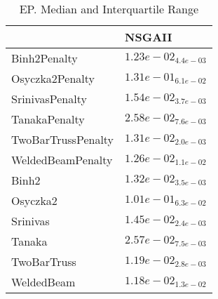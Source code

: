\documentclass{article}
\begin{document}
\begin{table}
\caption{EP. Median and Interquartile Range}
\label{table: EP}
\centering
\begin{scriptsize}
\begin{tabular}{ll}
\hline &  NSGAII\\
\hline 
Binh2Penalty & \cellcolor{gray95}$  1.23e-02_{ 4.4e-03}$ \\
Osyczka2Penalty & \cellcolor{gray95}$  1.31e-01_{ 6.1e-02}$ \\
SrinivasPenalty & \cellcolor{gray95}$  1.54e-02_{ 3.7e-03}$ \\
TanakaPenalty & \cellcolor{gray95}$  2.58e-02_{ 7.6e-03}$ \\
TwoBarTrussPenalty & \cellcolor{gray95}$  1.31e-02_{ 2.0e-03}$ \\
WeldedBeamPenalty & \cellcolor{gray95}$  1.26e-02_{ 1.1e-02}$ \\
Binh2 & \cellcolor{gray95}$  1.32e-02_{ 3.5e-03}$ \\
Osyczka2 & \cellcolor{gray95}$  1.01e-01_{ 6.3e-02}$ \\
Srinivas & \cellcolor{gray95}$  1.45e-02_{ 2.4e-03}$ \\
Tanaka & \cellcolor{gray95}$  2.57e-02_{ 7.5e-03}$ \\
TwoBarTruss & \cellcolor{gray95}$  1.19e-02_{ 2.8e-03}$ \\
WeldedBeam & \cellcolor{gray95}$  1.18e-02_{ 1.3e-02}$ \\
\hline
\end{tabular}
\end{scriptsize}
\end{table}
\end{document}
